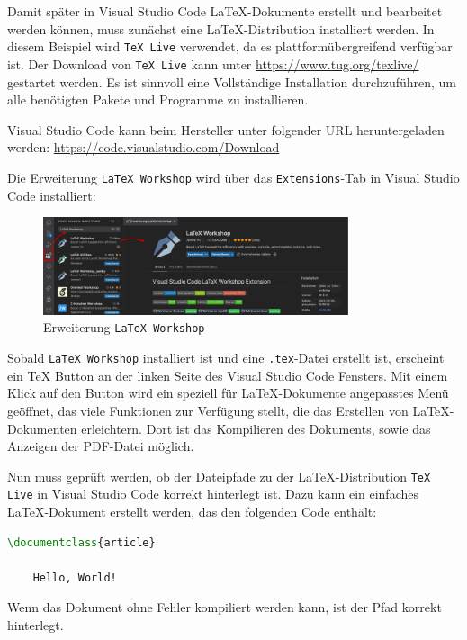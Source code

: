 Damit später in Visual Studio Code \LaTeX{}-Dokumente erstellt und bearbeitet werden können, muss zunächst eine \LaTeX{}-Distribution installiert werden. In diesem Beispiel wird \texttt{TeX Live} verwendet, da es plattformübergreifend verfügbar ist. Der Download von \texttt{TeX Live} kann unter \newline \href{https://www.tug.org/texlive/}{https://www.tug.org/texlive/} gestartet werden. Es ist sinnvoll eine Vollständige Installation durchzuführen, um alle benötigten Pakete und Programme zu installieren.

Visual Studio Code kann beim Hersteller unter folgender URL heruntergeladen werden: \newline \href{https://code.visualstudio.com/Download}{https://code.visualstudio.com/Download}

Die Erweiterung \texttt{LaTeX Workshop} wird über das \texttt{Extensions}-Tab in Visual Studio Code installiert:

\begin{figure}[H]
    \centering
    \includegraphics[width=0.8\textwidth]{anlagen/bilder/Latex_Workshop_Ext.pdf}
    \caption{Erweiterung \texttt{LaTeX Workshop}}
    \label{fig:visual_studio_code_latex_workshop}
\end{figure}

Sobald \texttt{LaTeX Workshop} installiert ist und eine \texttt{.tex}-Datei erstellt ist, erscheint ein \TeX{} Button an der linken Seite des Visual Studio Code Fensters. Mit einem Klick auf den Button wird ein speziell für \LaTeX{}-Dokumente angepasstes Menü geöffnet, das viele Funktionen zur Verfügung stellt, die das Erstellen von \LaTeX{}-Dokumenten erleichtern. Dort ist das Kompilieren des Dokuments, sowie das Anzeigen der PDF-Datei möglich.

Nun muss geprüft werden, ob der Dateipfade zu der \LaTeX{}-Distribution \texttt{TeX Live} in Visual Studio Code korrekt hinterlegt ist.
Dazu kann ein einfaches \LaTeX{}-Dokument erstellt werden, das den folgenden Code enthält:

\begin{minipage}{0.5\textwidth}
    \begin{lstlisting}[language=TeX, emph={documentclass, begin}, emphstyle={\color{blue}}]
\documentclass{article}

    Hello, World!

    \end{lstlisting}
\end{minipage}
\hfill
\parbox[b]{0.45\textwidth}{Wenn das Dokument ohne Fehler kompiliert werden kann, ist der Pfad korrekt hinterlegt.}

